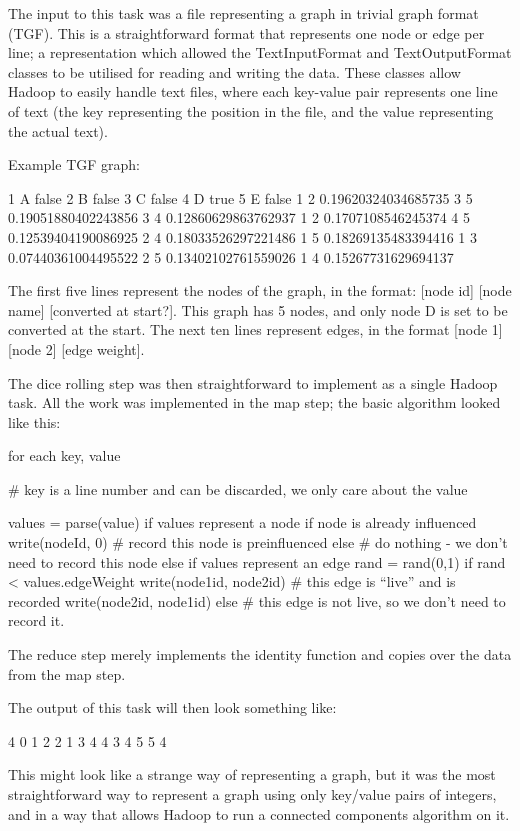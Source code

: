 The input to this task was a file representing a graph in trivial graph format (TGF). This is a straightforward format that represents one node or edge per line; a representation which allowed the TextInputFormat and TextOutputFormat classes to be utilised for reading and writing the data. These classes allow Hadoop to easily handle text files, where each key-value pair represents one line of text (the key representing the position in the file, and the value representing the actual text).

Example TGF graph:

1 A false
2 B false
3 C false
4 D true
5 E false
1 2 0.19620324034685735
3 5 0.19051880402243856
3 4 0.12860629863762937
1 2 0.1707108546245374
4 5 0.12539404190086925
2 4 0.18033526297221486
1 5 0.18269135483394416
1 3 0.07440361004495522
2 5 0.13402102761559026
1 4 0.15267731629694137

The first five lines represent the nodes of the graph, in the format: [node id] [node name] [converted at start?]. This graph has 5 nodes, and only node D is set to be converted at the start. The next ten lines represent edges, in the format [node 1] [node 2] [edge weight].

The dice rolling step was then straightforward to implement as a single Hadoop task. All the work was implemented in the map step; the basic algorithm looked like this:

for each key, value {
  # key is a line number and can be discarded, we only care about the value

  values = parse(value)
  if values represent a node {
    if node is already influenced {
      write(nodeId, 0) # record this node is preinfluenced
    } else {
      # do nothing - we don't need to record this node
    }
  } else if values represent an edge{
    rand = rand(0,1)
    if rand < values.edgeWeight {
      write(node1id, node2id) # this edge is ``live'' and is recorded
      write(node2id, node1id)
    } else {
      # this edge is not live, so we don't need to record it.
    }
  }
}

The reduce step merely implements the identity function and copies over the data from the map step.

The output of this task will then look something like:

4 0
1 2
2 1
3 4
4 3
4 5
5 4

This might look like a strange way of representing a graph, but it was the most straightforward way to represent a graph using only key/value pairs of integers, and in a way that allows Hadoop to run a connected components algorithm on it.

